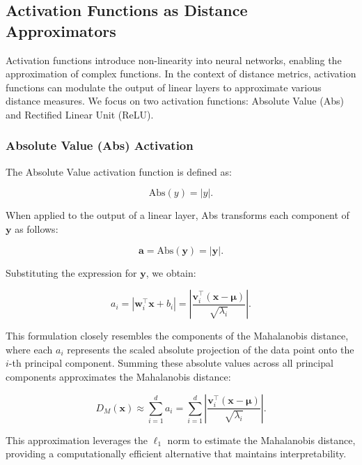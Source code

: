 \subsection{Activation Functions as Distance Approximators}

Activation functions introduce non-linearity into neural networks, enabling the approximation of complex functions. In the context of distance metrics, activation functions can modulate the output of linear layers to approximate various distance measures. We focus on two activation functions: Absolute Value (Abs) and Rectified Linear Unit (ReLU).

\subsubsection{Absolute Value (Abs) Activation}

The Absolute Value activation function is defined as:

\begin{equation}
\text{Abs}(y) = |y|.
\end{equation}

When applied to the output of a linear layer, Abs transforms each component of $\mathbf{y}$ as follows:

\begin{equation}
\mathbf{a} = \text{Abs}(\mathbf{y}) = |\mathbf{y}|.
\end{equation}

Substituting the expression for $\mathbf{y}$, we obtain:

\begin{equation}
a_i = \left| \mathbf{w}_i^\top \mathbf{x} + b_i \right| = \left| \frac{\mathbf{v}_i^\top (\mathbf{x} - \boldsymbol{\mu})}{\sqrt{\lambda_i}} \right|.
\end{equation}

This formulation closely resembles the components of the Mahalanobis distance, where each $a_i$ represents the scaled absolute projection of the data point onto the $i$-th principal component. Summing these absolute values across all principal components approximates the Mahalanobis distance:

\begin{equation}
D_M(\mathbf{x}) \approx \sum_{i=1}^d a_i = \sum_{i=1}^d \left| \frac{\mathbf{v}_i^\top (\mathbf{x} - \boldsymbol{\mu})}{\sqrt{\lambda_i}} \right|.
\end{equation}

This approximation leverages the $\ell_1$ norm to estimate the Mahalanobis distance, providing a computationally efficient alternative that maintains interpretability.

